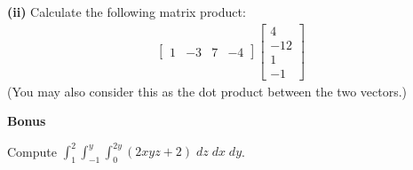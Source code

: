 \documentclass[12pt]{amsbook}
\newcommand{\DD}{\displaystyle}
\begin{document}
\vspace{10cm}


\textbf{(ii)} Calculate the following matrix product:
\begin{align*}
\left[\begin{array}{rlrl} 1 & -3 & 7 & -4 \end{array}\right] \left[\begin{array}{r}
4 \\ -12 \\ 1 \\ -1
\end{array}\right]
\end{align*}
(You may also consider this as the dot product between the two vectors.)


















\newpage

\textbf{Bonus} 

\vspace{.25cm}

Compute $\DD \int_1^2 \int_{-1}^y \int_0^{2y} (2xyz+2) \; dz \; dx \; dy$.
\end{document}
